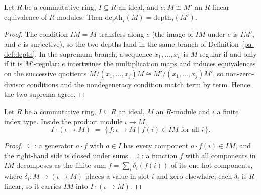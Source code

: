 \begin{lemma}
  \label{pa-lem:depth_linearEquiv}
  \leanok

  Let \(R\) be a commutative ring, \(I \subseteq R\) an ideal, and \(e : M \cong M'\) an
  \(R\)-linear equivalence of \(R\)-modules. Then
  \(\mathrm{depth}_I(M) = \mathrm{depth}_I(M')\).
\end{lemma}
\begin{proof}
  \leanok
  The condition \(IM = M\) transfers along \(e\) (the image of \(IM\) under \(e\) is
  \(IM'\), and \(e\) is surjective), so the two depths land in the same branch of
  Definition~\ref{pa-def:depth}. In the supremum branch, a sequence \(x_1, \dots, x_n\) is
  \(M\)-regular if and only if it is \(M'\)-regular: \(e\) intertwines the
  multiplication maps and induces equivalences on the successive quotients
  \(M/(x_1, \dots, x_j)M \cong M'/(x_1, \dots, x_j)M'\), so non-zero-divisor conditions
  and the nondegeneracy condition match term by term. Hence the two suprema agree.
\end{proof}

\begin{lemma}
  \label{pa-lem:ideal_smul_top_pi}
  \leanok

  Let \(R\) be a commutative ring, \(I \subseteq R\) an ideal, \(M\) an \(R\)-module and
  \(\iota\) a finite index type. Inside the product module \(\iota \to M\),
  \[
    I \cdot (\iota \to M) \;=\; \{\, f : \iota \to M \mid f(i) \in IM
      \text{ for all } i \,\}.
  \]
\end{lemma}
\begin{proof}
  \leanok
  \(\subseteq\): a generator \(a \cdot f\) with \(a \in I\) has every component
  \(a \cdot f(i) \in IM\), and the right-hand side is closed under sums.
  \(\supseteq\): a function \(f\) with all components in \(IM\) decomposes as the finite
  sum \(f = \sum_i \delta_i(f(i))\) of its one-hot components, where
  \(\delta_i : M \to (\iota \to M)\) places a value in slot \(i\) and zero elsewhere;
  each \(\delta_i\) is \(R\)-linear, so it carries \(IM\) into
  \(I \cdot (\iota \to M)\).
\end{proof}

